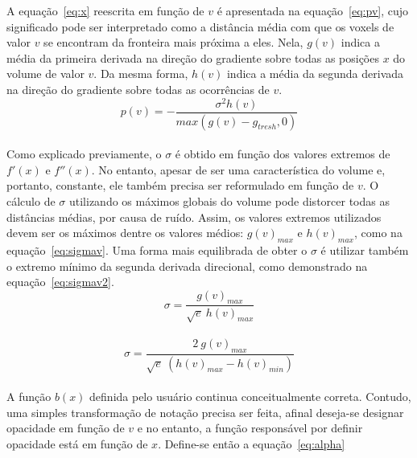 	A equação~\eqref{eq:x} reescrita em função de $v$ é apresentada na equação~\eqref{eq:pv}, cujo significado pode ser interpretado como a distância média com que os voxels de valor $v$ se encontram da fronteira mais próxima a eles. Nela, $g(v)$ indica a média da primeira derivada na direção do gradiente sobre todas as posições $x$ do volume de valor $v$. Da mesma forma, $h(v)$ indica a média da segunda derivada na direção do gradiente sobre todas as ocorrências de $v$. %
	\\	

\begin{equation} \label{eq:pv}
	p(v) = -\frac{\sigma^{2}h(v)}{max(g(v) - g_{tresh}, 0)}
\end{equation} \\

	Como explicado previamente, o $\sigma$ é obtido em função dos valores extremos de $f'(x)$ e $f''(x)$. No entanto, apesar de ser uma característica do volume e, portanto, constante, ele também precisa ser reformulado em função de $v$. O cálculo de $\sigma$ utilizando os máximos globais do volume pode distorcer todas as distâncias médias, por causa de ruído. Assim, os valores extremos utilizados devem ser os máximos dentre os valores médios: $g(v)_{max}$ e $h(v)_{max}$, como na equação~\eqref{eq:sigmav}. Uma forma mais equilibrada de obter o $\sigma$ é utilizar também o extremo mínimo da segunda derivada direcional, como demonstrado na equação~\eqref{eq:sigmav2}. \\
	
\begin{equation} \label{eq:sigmav}
	\sigma = \frac{g(v)_{max}}{\sqrt{e}\ h(v)_{max}}
\end{equation} \\

\begin{equation} \label{eq:sigmav2}
	\sigma = \frac{2\ g(v)_{max}}{\sqrt{e}\ (h(v)_{max} - h(v)_{min})}
\end{equation} \\

	A função $b(x)$ definida pelo usuário continua conceitualmente correta. Contudo, uma simples transformação de notação precisa ser feita, afinal deseja-se designar opacidade em função de $v$ e no entanto, a função responsável por definir opacidade está em função de $x$. Define-se então a equação~\eqref{eq:alpha} \\
	
